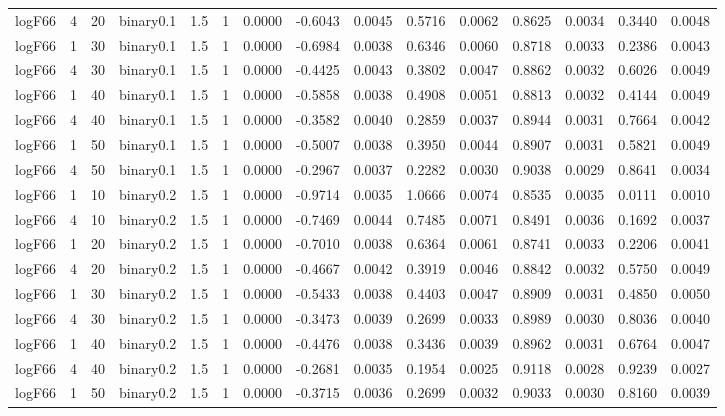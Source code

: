 \begin{longtable}{rrrrrrrrrrrrrrr}
  logF66 & 4 & 20 & binary0.1 & 1.5 & 1 & 0.0000 & -0.6043 & 0.0045 & 0.5716 & 0.0062 & 0.8625 & 0.0034 & 0.3440 & 0.0048 \\ 
  logF66 & 1 & 30 & binary0.1 & 1.5 & 1 & 0.0000 & -0.6984 & 0.0038 & 0.6346 & 0.0060 & 0.8718 & 0.0033 & 0.2386 & 0.0043 \\ 
  logF66 & 4 & 30 & binary0.1 & 1.5 & 1 & 0.0000 & -0.4425 & 0.0043 & 0.3802 & 0.0047 & 0.8862 & 0.0032 & 0.6026 & 0.0049 \\ 
  logF66 & 1 & 40 & binary0.1 & 1.5 & 1 & 0.0000 & -0.5858 & 0.0038 & 0.4908 & 0.0051 & 0.8813 & 0.0032 & 0.4144 & 0.0049 \\ 
  logF66 & 4 & 40 & binary0.1 & 1.5 & 1 & 0.0000 & -0.3582 & 0.0040 & 0.2859 & 0.0037 & 0.8944 & 0.0031 & 0.7664 & 0.0042 \\ 
  logF66 & 1 & 50 & binary0.1 & 1.5 & 1 & 0.0000 & -0.5007 & 0.0038 & 0.3950 & 0.0044 & 0.8907 & 0.0031 & 0.5821 & 0.0049 \\ 
  logF66 & 4 & 50 & binary0.1 & 1.5 & 1 & 0.0000 & -0.2967 & 0.0037 & 0.2282 & 0.0030 & 0.9038 & 0.0029 & 0.8641 & 0.0034 \\ 
  logF66 & 1 & 10 & binary0.2 & 1.5 & 1 & 0.0000 & -0.9714 & 0.0035 & 1.0666 & 0.0074 & 0.8535 & 0.0035 & 0.0111 & 0.0010 \\ 
  logF66 & 4 & 10 & binary0.2 & 1.5 & 1 & 0.0000 & -0.7469 & 0.0044 & 0.7485 & 0.0071 & 0.8491 & 0.0036 & 0.1692 & 0.0037 \\ 
  logF66 & 1 & 20 & binary0.2 & 1.5 & 1 & 0.0000 & -0.7010 & 0.0038 & 0.6364 & 0.0061 & 0.8741 & 0.0033 & 0.2206 & 0.0041 \\ 
  logF66 & 4 & 20 & binary0.2 & 1.5 & 1 & 0.0000 & -0.4667 & 0.0042 & 0.3919 & 0.0046 & 0.8842 & 0.0032 & 0.5750 & 0.0049 \\ 
  logF66 & 1 & 30 & binary0.2 & 1.5 & 1 & 0.0000 & -0.5433 & 0.0038 & 0.4403 & 0.0047 & 0.8909 & 0.0031 & 0.4850 & 0.0050 \\ 
  logF66 & 4 & 30 & binary0.2 & 1.5 & 1 & 0.0000 & -0.3473 & 0.0039 & 0.2699 & 0.0033 & 0.8989 & 0.0030 & 0.8036 & 0.0040 \\ 
  logF66 & 1 & 40 & binary0.2 & 1.5 & 1 & 0.0000 & -0.4476 & 0.0038 & 0.3436 & 0.0039 & 0.8962 & 0.0031 & 0.6764 & 0.0047 \\ 
  logF66 & 4 & 40 & binary0.2 & 1.5 & 1 & 0.0000 & -0.2681 & 0.0035 & 0.1954 & 0.0025 & 0.9118 & 0.0028 & 0.9239 & 0.0027 \\ 
  logF66 & 1 & 50 & binary0.2 & 1.5 & 1 & 0.0000 & -0.3715 & 0.0036 & 0.2699 & 0.0032 & 0.9033 & 0.0030 & 0.8160 & 0.0039 \\ 

\end{longtable}
